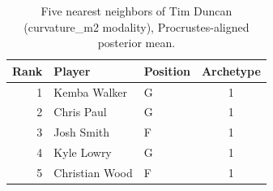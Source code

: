 \begin{table}[htbp]
  \centering\small
  \begin{tabular}{rllc}
    \toprule
    Rank & Player & Position & Archetype \\
    \midrule
    1 & Kemba Walker & G & 1 \\
    2 & Chris Paul & G & 1 \\
    3 & Josh Smith & F & 1 \\
    4 & Kyle Lowry & G & 1 \\
    5 & Christian Wood & F & 1 \\
    \bottomrule
  \end{tabular}
  \caption{Five nearest neighbors of Tim Duncan (curvature_m2 modality), Procrustes-aligned posterior mean.}
  \label{tab:Tim_Duncan_neighbors_curvature_m2}
\end{table}

